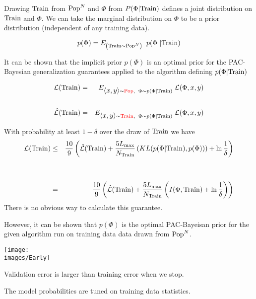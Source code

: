 {

Drawing $\mathrm{Train}$ from $\mathrm{Pop}^N$ and $\Phi$ from $P(\Phi|\mathrm{Train})$ defines a joint distribution on $\mathrm{Train}$ and $\Phi$.  We can take the marginal distribution on $\Phi$
to be a prior distribution (independent of any training data).

\vfill
$$p(\Phi) = E_{\left(\mathrm{Train} \sim \mathrm{Pop}^N\right)}\;\;p(\Phi\;|\mathrm{Train})$$

\vfill
It can be shown that the implicit prior $p(\Phi)$ is an optimal prior for the PAC-Bayesian generalization guarantees applied to the algorithm defining $p(\Phi|\mathrm{Train})$

\vfill
{}

\begin{eqnarray*}
{\cal L}(\mathrm{Train}) & = & E_{{\mbox{$\langle x,y\rangle$}} \sim {\color{red}  \mathrm{Pop}}, \;\;\Phi \sim p(\Phi|\mathrm{Train})}\;{\cal L}(\Phi,x,y) \\
\\
\hat{\cal L}(\mathrm{Train}) & = & E_{{\mbox{$\langle x,y\rangle$}} \sim {\color{red} \mathrm{Train}}, \;\;\Phi \sim p(\Phi|\mathrm{Train})}\;{\cal L}(\Phi,x,y)
\end{eqnarray*}


With probability at least $1-\delta$ over the draw of $\mathrm{Train}$ we have
\vfill
{\huge
\begin{eqnarray*}
{\cal L}(\mathrm{Train}) & \leq & \frac{10}{9}\left( \hat{\cal L}(\mathrm{Train}) + \frac{5L_{\max}}{N_\mathrm{Train}}\left(KL(p(\Phi|\mathrm{Train}),p(\Phi)\right))+ \ln\frac{1}{\delta}\right) \\
\\
\\
& = & \frac{10}{9}\left( \hat{\cal L}(\mathrm{Train}) + \frac{5L_{\max}}{N_\mathrm{Train}}\left(I(\Phi,\mathrm{Train})+ \ln\frac{1}{\delta}\right)\right)
\end{eqnarray*}
}
\vfill
There is no obvious way to calculate this guarantee.

\vfill
However, it can be shown that $p(\Phi)$ is the optimal PAC-Bayeisan prior for the given algorithm run on training data data drawn from $\mathrm{Pop}^N$.


\centerline{\texttt{[image: \\images/Early]}}

\vfill
Validation error is larger than training error when we stop.

\vfill
The model probabilities are tuned on training data statistics.

}
